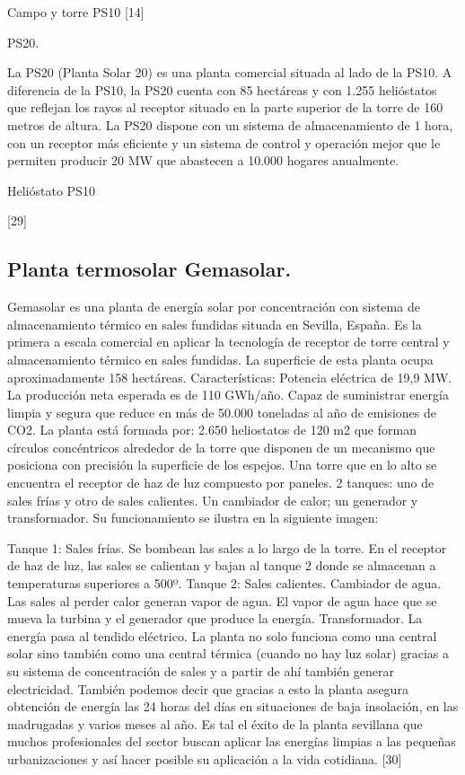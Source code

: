 \documentclass[12pt]{article}
\begin{document}
Campo y torre PS10
[14]



PS20.

La PS20 (Planta Solar 20) es una planta comercial situada al lado de la PS10.
A diferencia de la PS10, la PS20 cuenta con 85 hectáreas y con 1.255 helióstatos que reflejan los rayos al receptor situado en la parte superior de la torre de 160 metros de altura.
La PS20 dispone con un sistema de almacenamiento de 1 hora, con un receptor más eficiente y un sistema de control y operación mejor que le permiten producir 20 MW que abastecen a 10.000 hogares anualmente.

Helióstato PS10

[29]

\subsection{Planta termosolar Gemasolar.}

Gemasolar es una planta de energía solar por concentración con sistema de almacenamiento térmico en sales fundidas situada en Sevilla, España. Es la primera a escala comercial en aplicar la tecnología de receptor de torre central y almacenamiento térmico en sales fundidas. La superficie de esta planta ocupa aproximadamente 158 hectáreas. Características:
Potencia eléctrica de 19,9 MW.
La producción neta esperada es de 110 GWh/año.
Capaz de suministrar energía limpia y segura que reduce en más de 50.000 toneladas al año de emisiones de CO2.
La planta está formada por:
2.650 heliostatos de 120 m2 que forman círculos concéntricos alrededor de la torre que disponen de un mecanismo que posiciona con precisión la superficie de los espejos.
Una torre que en lo alto se encuentra el receptor de haz de luz compuesto por paneles.
2 tanques: uno de sales frías y otro de sales calientes.
Un cambiador de calor; un generador y transformador.
Su funcionamiento se ilustra en la siguiente imagen:

Tanque 1: Sales frías.
Se bombean las sales a lo largo de la torre.
En el receptor de haz de luz, las sales se calientan y bajan al tanque 2 donde se almacenan a temperaturas superiores a 500º.
Tanque 2: Sales calientes.
Cambiador de agua.
Las sales al perder calor generan vapor de agua.
El vapor de agua hace que se mueva la turbina y el generador que produce la energía.
Transformador. La energía pasa al tendido eléctrico.
La planta no solo funciona como una central solar sino también como una central térmica (cuando no hay luz solar) gracias a su sistema de concentración de sales y a partir de ahí también generar electricidad. También podemos decir que gracias a esto la planta asegura obtención de energía las 24 horas del días en situaciones de baja insolación, en las madrugadas y varios meses al año.
Es tal el éxito de la planta sevillana que muchos profesionales del sector buscan aplicar las energías limpias a las pequeñas urbanizaciones y así hacer posible su aplicación a la vida cotidiana. [30]
\end{document}
